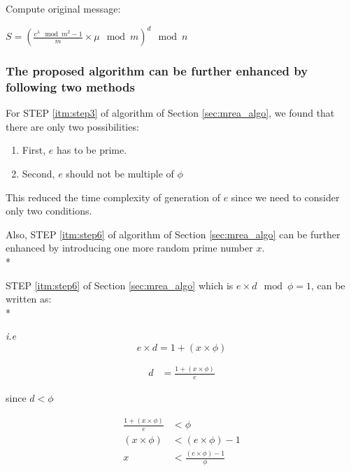 \documentclass[12pt,journal,compsoc]{IEEEtran}
\begin{document}
Compute original message:
\begin{center}
	$S = (\frac{c^{\lambda}\mod m^{2}-1}{m}\times \mu \mod m)^{d} \mod n$
\end{center}

\par

\subsubsection{\bf The proposed algorithm\cite{securersa} can be further enhanced by following two methods}
\par \par
For STEP \ref{itm:step3} of algorithm of Section \ref{sec:mrea_algo}, we found that there are only two possibilities:

\begin{enumerate}
	\item First, $e$ has to be prime.
	\item Second, $e$ should not be multiple of $\phi$
\end{enumerate}
This reduced the time complexity of generation of $e$ since we need to consider only two conditions.

Also, STEP \ref{itm:step6} of algorithm of Section \ref{sec:mrea_algo} can be further enhanced by introducing one more random prime number $x$. \\*

STEP \ref{itm:step6} of Section \ref{sec:mrea_algo} which is $e \times d \mod \phi = 1$, can be written as:\\* 

\emph{i.e}
\begin{equation}
e \times d = 1 + (x \times \phi)
\end{equation}

\begin{align*}
	d &= \frac{1 + (x\times\phi)}{e}
\end{align*}

since $d < \phi$

\begin{align*}
	\frac{1 + (x \times \phi)}{e} &< \phi \\
	(x \times \phi) &< (e \times \phi) -1 \\
	x &< \frac{(e \times \phi) -1}{\phi} \\
\end{align*}
\end{document}
